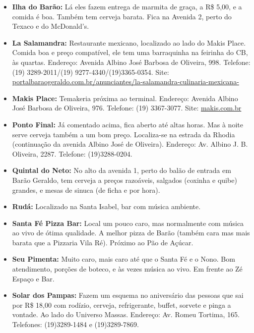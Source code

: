 \begin{itemize}
\item  \textbf{Ilha do Barão:} Lá eles fazem entrega de marmita de graça, a R\$ 5,00, e a comida é boa. Também tem cerveja barata. Fica na Avenida 2, perto do Texaco e do McDonald's.

\item  \textbf{La Salamandra:} Restaurante mexicano, localizado ao lado do Makis Place. Comida boa e preço compatível, ele tem uma barraquinha na feirinha do CB, às quartas. Endereço: Avenida Albino José Barbosa de Oliveira, 998. Telefone: (19) 3289-2011/(19) 9277-4340/(19)3365-0354. Site: \url{portalbaraogeraldo.com.br/anunciantes/la-salamandra-culinaria-mexicana-}

\item  \textbf{Makis Place:} Temakeria próxima ao terminal. Endereço: Avenida Albino José Barbosa de Oliveira, 976. Telefone: (19) 3367-3077. Site: \url{makis.com.br}

\item  \textbf{Ponto Final:} Já comentado acima, fica aberto até altas horas. Mas à noite serve cerveja também a um bom preço. Localiza-se na estrada da Rhodia (continuação da avenida Albino José de Oliveira). Endereço: Av. Albino J. B. Oliveira, 2287. Telefone: (19)3288-0204.

\item  \textbf{Quintal do Neto:} No alto da avenida 1, perto do balão de entrada em Barão Geraldo, tem cerveja a preços razoáveis, salgados (coxinha e quibe) grandes, e mesas de sinuca (de ficha e por hora).

\item  \textbf{Rudá:} Localizado na Santa Isabel, bar com música ambiente.

\item  \textbf{Santa Fé Pizza Bar:} Local um pouco caro, mas normalmente com música ao vivo de ótima qualidade. A melhor pizza de Barão (também cara mas mais barata que a Pizzaria Vila Ré). Próximo ao Pão de Açúcar.

\item  \textbf{Seu Pimenta:} Muito caro, mais caro até que o Santa Fé e o Nono. Bom atendimento, porções de boteco, e às vezes música ao vivo. Em frente ao Zé Espaço e Bar.

\item  \textbf{Solar dos Pampas:} Fazem um esquema no aniversário das pessoas que sai por R\$ 18,00 com rodízio, cerveja, refrigerante, buffet, sorvete e pinga a vontade. Ao lado do Universo Massas. Endereço: Av. Romeu Tortima, 165. Telefones: (19)3289-1484 e (19)3289-7869.


\end{itemize}
